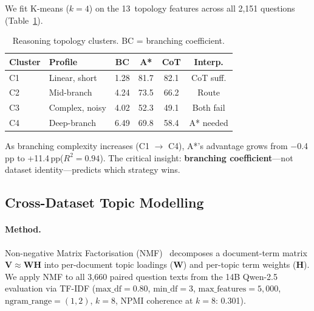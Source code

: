 \documentclass[11pt]{article}
\newcommand{\pp}{\,pp\xspace}
\begin{document}
We fit K-means ($k{=}4$) on the 13~topology features across all 2,151
questions (Table~\ref{tab:topology}).

\begin{table}[t]
\centering
\caption{Reasoning topology clusters.  BC = branching coefficient.}
\label{tab:topology}
\small
\begin{tabular}{@{}llcccc@{}}
\toprule
\textbf{Cluster} & \textbf{Profile} & \textbf{BC} & \textbf{A*} & \textbf{CoT}
  & \textbf{Interp.} \\
\midrule
C1 & Linear, short  & 1.28 & 81.7 & 82.1 & CoT suff. \\
C2 & Mid-branch     & 4.24 & 73.5 & 66.2 & Route \\
C3 & Complex, noisy & 4.02 & 52.3 & 49.1 & Both fail \\
C4 & Deep-branch    & 6.49 & 69.8 & 58.4 & A* needed \\
\bottomrule
\end{tabular}
\end{table}

As branching complexity increases (C1 $\rightarrow$ C4), A*'s advantage grows
from $-$0.4\pp to +11.4\pp ($R^2{=}0.94$).  The critical insight:
\textbf{branching coefficient}---not dataset identity---predicts which
strategy wins.

\subsection{Cross-Dataset Topic Modelling}
\label{sec:topic}

\paragraph{Method.}
Non-negative Matrix Factorisation (NMF)~\citep{lee1999learning} decomposes a
document-term matrix $\mathbf{V}\!\approx\!\mathbf{W}\mathbf{H}$ into
per-document topic loadings ($\mathbf{W}$) and per-topic term weights
($\mathbf{H}$).  We apply NMF to all 3,660 paired question texts from the 14B
Qwen-2.5 evaluation via TF-IDF ($\mathrm{max\_df}{=}0.80$,
$\mathrm{min\_df}{=}3$, $\mathrm{max\_features}{=}5{,}000$,
$\mathrm{ngram\_range}{=}(1,2)$, $k{=}8$, NPMI coherence at $k{=}8$: 0.301).
\end{document}
